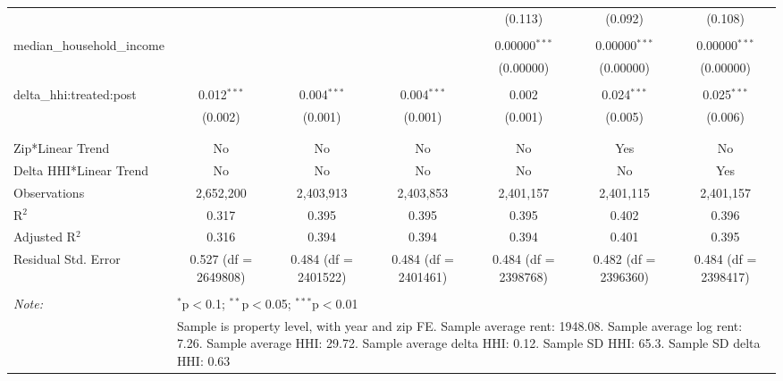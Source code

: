 \begin{table}[H]
{\begin{tabular}{@{\extracolsep{5pt}}lcccccc}
   &  &  &  & (0.113) & (0.092) & (0.108) \\  

   & & & & & & \\  

  median\_household\_income &  &  &  & 0.00000$^{***}$ & 0.00000$^{***}$ & 0.00000$^{***}$ \\  

   &  &  &  & (0.00000) & (0.00000) & (0.00000) \\  

   & & & & & & \\  

  delta\_hhi:treated:post & 0.012$^{***}$ & 0.004$^{***}$ & 0.004$^{***}$ & 0.002 & 0.024$^{***}$ & 0.025$^{***}$ \\  

   & (0.002) & (0.001) & (0.001) & (0.001) & (0.005) & (0.006) \\  

   & & & & & & \\  

 \hline \\[-1.8ex]  

 Zip*Linear Trend & No & No & No & No & Yes & No \\  

 Delta HHI*Linear Trend & No & No & No & No & No & Yes \\  

 Observations & 2,652,200 & 2,403,913 & 2,403,853 & 2,401,157 & 2,401,115 & 2,401,157 \\  

 R$^{2}$ & 0.317 & 0.395 & 0.395 & 0.395 & 0.402 & 0.396 \\  

 Adjusted R$^{2}$ & 0.316 & 0.394 & 0.394 & 0.394 & 0.401 & 0.395 \\  

 Residual Std. Error & 0.527 (df = 2649808) & 0.484 (df = 2401522) & 0.484 (df = 2401461) & 0.484 (df = 2398768) & 0.482 (df = 2396360) & 0.484 (df = 2398417) \\  

 \hline  

 \hline \\[-1.8ex]  

 \textit{Note:}  & \multicolumn{6}{l}{$^{*}$p$<$0.1; $^{**}$p$<$0.05; $^{***}$p$<$0.01} \\  

  & \multicolumn{6}{l}{Sample is property level, with year and zip FE. Sample average rent: 1948.08. Sample average log rent: 7.26. Sample average HHI: 29.72. Sample average delta HHI: 0.12. Sample SD HHI: 65.3. Sample SD delta HHI: 0.63} \\  

 \end{tabular}}  

 \end{table}  

